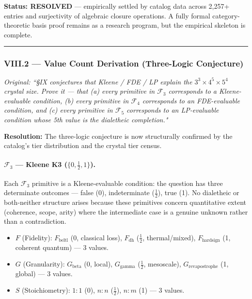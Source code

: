 \documentclass[12pt,a4paper]{article}
\begin{document}
\textbf{Status: RESOLVED} --- empirically settled by catalog data across 2,257+ entries and surjectivity of algebraic closure operations. A fully formal category-theoretic basis proof remains as a research program, but the empirical skeleton is complete.

\begin{center}
\rule{0.5\textwidth}{0.4pt}
\end{center}

\subsubsection{VIII.2 --- Value Count Derivation (Three-Logic Conjecture)}
\emph{Original: ``\S IX conjectures that Kleene / FDE / LP explain the $3^3 \times 4^5 \times 5^4$ crystal size. Prove it --- that (a) every primitive in $\mathcal{F}_3$ corresponds to a Kleene-evaluable condition, (b) every primitive in $\mathcal{F}_4$ corresponds to an FDE-evaluable condition, and (c) every primitive in $\mathcal{F}_5$ corresponds to an LP-evaluable condition whose 5th value is the dialetheic completion."}

\textbf{Resolution:}
The three-logic conjecture is now structurally confirmed by the catalog's tier distribution and the crystal tier census.

\paragraph{$\mathcal{F}_3$ --- Kleene K3 ($\{0, \frac12, 1\}$).}
Each $\mathcal{F}_3$ primitive is a Kleene-evaluable condition: the question has three determinate outcomes --- false (0), indeterminate ($\frac12$), true (1). No dialetheic or both-neither structure arises because these primitives concern quantitative extent (coherence, scope, arity) where the intermediate case is a genuine unknown rather than a contradiction.
\begin{itemize}
\item $F$ (Fidelity): $F_{\text{beltl}}$ (0, classical loss), $F_{\text{dh}}$ ($\frac12$, thermal/mixed), $F_{\text{hardsign}}$ (1, coherent quantum) --- 3 values.
\item $G$ (Granularity): $G_{\text{beta}}$ (0, local), $G_{\text{gamma}}$ ($\frac12$, mesoscale), $G_{\text{revapostrophe}}$ (1, global) --- 3 values.
\item $S$ (Stoichiometry): $1{:}1$ (0), $n{:}n$ ($\frac12$), $n{:}m$ (1) --- 3 values.
\end{itemize}
\end{document}
